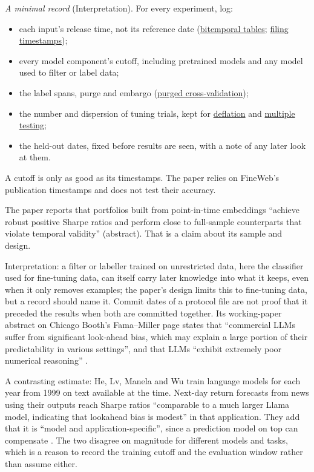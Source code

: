 \begin{qfmethod}
 \emph{A minimal record} (Interpretation). For every experiment, log:
\begin{itemize}
\item each input's release time, not its reference date (\hyperref[meth:bitemporal-reference-tables]{bitemporal tables}; \hyperref[data:holdings-insider-filing-lags]{filing timestamps});
\item every model component's cutoff, including pretrained models and any model used to filter or label data;
\item the label spans, purge and embargo (\hyperref[meth:purged-embargoed-cross-validation]{purged cross-validation});
\item the number and dispersion of tuning trials, kept for \hyperref[meth:deflated-sharpe-ratio]{deflation} and \hyperref[meth:multiple-testing-control]{multiple testing};
\item the held-out dates, fixed before results are seen, with a note of any later look at them.
\end{itemize}
A cutoff is only as good as its timestamps. The paper relies on FineWeb's publication timestamps and does not test their accuracy.

 The paper reports that portfolios built from point-in-time embeddings ``achieve robust positive Sharpe ratios and perform close to full-sample counterparts that violate temporal validity'' (abstract). That is a claim about its sample and design.

 Interpretation: a filter or labeller trained on unrestricted data, here the classifier used for fine-tuning data, can itself carry later knowledge into what it keeps, even when it only removes examples; the paper's design limits this to fine-tuning data, but a record should name it. Commit dates of a protocol file are not proof that it preceded the results when both are committed together. Its working-paper abstract on Chicago Booth's Fama--Miller page states that ``commercial LLMs suffer from significant look-ahead bias, which may explain a large portion of their predictability in various settings'', and that LLMs ``exhibit extremely poor numerical reasoning'' \citep[working-paper abstract on the Fama--Miller Center page]{latest-levy-caution-llm}.

A contrasting estimate: He, Lv, Manela and Wu train language models for each year from 1999 on text available at the time. Next-day return forecasts from news using their outputs reach Sharpe ratios ``comparable to a much larger Llama model, indicating that lookahead bias is modest'' in that application. They add that it is ``model and application-specific'', since a prediction model on top can compensate \citep[arXiv v3, 6 July 2025, abstract]{wide-chrono-llm}. The two disagree on magnitude for different models and tasks, which is a reason to record the training cutoff and the evaluation window rather than assume either.


\end{qfmethod}
